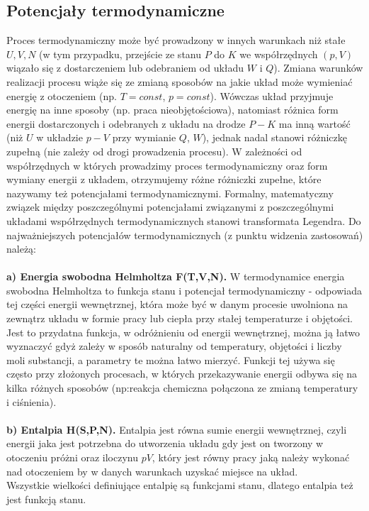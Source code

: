 \documentclass[12pt,a4paper,openright]{report} %
\begin{document}
\subsection{Potencjały termodynamiczne} 
Proces termodynamiczny może być prowadzony w innych warunkach niż stałe $U, V, N$ (w tym przypadku, przejście ze stanu $P$ do $K$ we współrzędnych $(p, V)$ wiązało się z dostarczeniem lub odebraniem od układu $W$ i $Q$). Zmiana warunków realizacji procesu wiąże się ze zmianą sposobów na jakie układ może wymieniać energię z otoczeniem (np. $T=const$, $p=const$). Wówczas układ przyjmuje energię na inne sposoby (np. praca nieobjętościowa), natomiast różnica form energii dostarczonych i odebranych z układu na drodze $P-K$ ma inną wartość (niż $U$ w układzie $p-V$ przy wymianie $Q$, $W$), jednak nadal stanowi różniczkę zupełną (nie zależy od drogi prowadzenia procesu). W zależności od współrzędnych w których prowadzimy proces termodynamiczny oraz form wymiany energii z układem, otrzymujemy różne różniczki zupełne, które nazywamy też potencjałami termodynamicznymi. 
Formalny, matematyczny związek między poszczególnymi potencjałami związanymi z poszczególnymi układami współrzędnych termodynamicznych stanowi transformata Legendra. Do najważniejszych potencjałów termodynamicznych (z punktu widzenia zastosowań) należą:
\\
\\
\textbf{a) Energia swobodna Helmholtza F(T,V,N).} W termodynamice energia swobodna Helmholtza to funkcja stanu i potencjał termodynamiczny - odpowiada tej części energii wewnętrznej, która może być w danym procesie uwolniona na zewnątrz układu w formie pracy lub ciepła przy stałej temperaturze i objętości.\\
Jest to przydatna funkcja, w odróżnieniu od energii wewnętrznej, można ją łatwo wyznaczyć gdyż zależy w sposób naturalny od temperatury, objętości i liczby moli substancji, a parametry te można łatwo mierzyć. Funkcji tej używa się często przy złożonych procesach, w których przekazywanie energii odbywa się na kilka różnych sposobów (np:reakcja chemiczna połączona ze zmianą temperatury i ciśnienia).\\
\\
\textbf{b) Entalpia H(S,P,N).} Entalpia jest równa sumie energii wewnętrznej, czyli energii jaka jest potrzebna do utworzenia układu gdy jest on tworzony w otoczeniu próżni oraz iloczynu $pV$, który jest równy pracy jaką należy wykonać nad otoczeniem by w danych warunkach uzyskać miejsce na układ.\\
Wszystkie wielkości definiujące entalpię są funkcjami stanu, dlatego entalpia też jest funkcją stanu.\\
\end{document}
